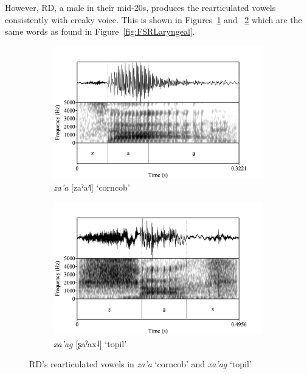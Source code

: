 However, RD, a male in their mid-20s, produces the rearticulated vowels consistently with creaky voice. This is shown in Figures~\ref{fig:RDza'a} and ~\ref{fig:RDxa'ag} which are the same words as found in Figure~\ref{fig:FSRLaryngeal}. 

\begin{figure}[h!]
	\centering
	\begin{subfigure}{.5\textwidth}
		\centering
		\includegraphics[width=\linewidth]{Images/Spectrograms/RD_za'a.png}
		\caption{\textit{za'a} [zaˀa˧˥] `corncob'}
		\label{fig:RDza'a}
	\end{subfigure}%
	\begin{subfigure}{.5\textwidth}
		\centering
		\includegraphics[width=\linewidth]{Images/Spectrograms/RD_xa'ag.png}
		\caption{\textit{xa'ag} [ʂaˀax˨] `topil'}
		\label{fig:RDxa'ag}
	\end{subfigure}
	\caption{RD's rearticulated vowels in \textit{za'a} `corncob' and \textit{xa'ag} `topil'}
	\label{fig:RDLaryngeal}
\end{figure}

